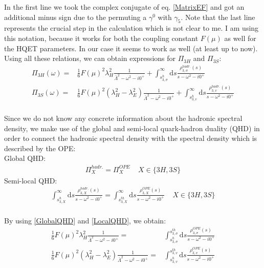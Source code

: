\documentclass[openright,twoside,12pt,a4paper,final]{article}
\begin{document}
	In the first line we took the complex conjugate of eq. \eqref{MatrixEF} and got an additional minus sign due to the permuting a $\gamma^0$ with $\gamma_5$. Note that the last line represents the crucial step in the calculation which is not clear to me. I am using this notation, because it works for both the coupling constant $F(\mu)$ as well for the HQET parameters. In our case it seems to work as well (at least up to now). \\ Using all these relations, we can obtain expressions for $\Pi_{3H}$ and $\Pi_{3S}$: \\
	\begin{align}
		\Pi_{3H}(\omega) =& \frac{1}{6} F(\mu)^2 \lambda_H^2 \frac{1}{\bar{\Lambda}^2 - \omega^2 - i0^+} + \int_{s_{3,\sigma}^h}^{\infty} \mathrm{d}s \frac{\rho_{3,\sigma}^{hadr.}(s)}{s - \omega^2 - i0^+} \\
		\Pi_{3S}(\omega) =& \frac{1}{6} F(\mu)^2 (\lambda_H^2 - \lambda_E^2) \frac{1}{\bar{\Lambda}^2 - \omega^2 - i0^+} + \int_{s_{3,v}^h}^{\infty} \mathrm{d}s \frac{\rho_{3,v}^{hadr.}(s)}{s - \omega^2 - i0^+}
	\end{align} \\
	Since we do not know any concrete information about the hadronic spectral density, we make use of the global and semi-local quark-hadron duality (QHD) in order to connect the hadronic spectral density with the spectral density which is described by the OPE: \\
	Global QHD: \begin{align} \Pi_X^{hadr.} = \Pi_X^{OPE} \; \; \; \; X \in \{3H,3S\} \label{GlobalQHD} \end{align} 
	Semi-local QHD: \begin{align} \int_{s_{3,X}^h}^{\infty} \mathrm{d}s \frac{\rho_{3,X}^{hadr.}(s)}{s - \omega^2 - i0^+} = \int_{s_{3,X}^{th}}^{\infty} \mathrm{d}s \frac{\rho_{3,X}^{OPE}(s)}{s - \omega^2 - i0^+} \; \; \; \; X \in \{3H,3S\} \label{LocalQHD} \end{align}  \\
	By using \eqref{GlobalQHD} and \eqref{LocalQHD}, we obtain:
	\begin{align}
		\frac{1}{6} F(\mu)^2 \lambda_H^2 \frac{1}{\bar{\Lambda}^2 - \omega^2 - i0^+} =& \int_{s_{3,\sigma}^h}^{s_{3,\sigma}^{th}} \mathrm{d}s \frac{\rho_{3,\sigma}^{OPE}(s)}{s - \omega^2 - i0^+} \\
		\frac{1}{6} F(\mu)^2 (\lambda_H^2 - \lambda_E^2) \frac{1}{\bar{\Lambda}^2 - \omega^2 - i0^+} =& \int_{s_{3,v}^h}^{s_{3,v}^{th}} \mathrm{d}s \frac{\rho_{3,v}^{OPE}(s)}{s - \omega^2 - i0^+}
	\end{align} \\
\end{document}
